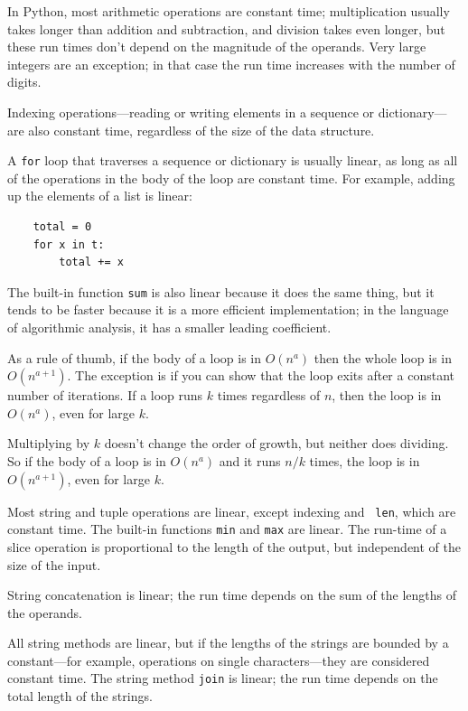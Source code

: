 \documentclass[10pt]{book}
\begin{document}
In Python, most arithmetic operations are constant time;
multiplication usually takes longer than addition and subtraction, and
division takes even longer, but these run times don't depend on the
magnitude of the operands.  Very large integers are an exception; in
that case the run time increases with the number of digits.

Indexing operations---reading or writing elements in a sequence
or dictionary---are also constant time, regardless of the size
of the data structure.

A {\tt for} loop that traverses a sequence or dictionary is
usually linear, as long as all of the operations in the body
of the loop are constant time.  For example, adding up the
elements of a list is linear:

\begin{verbatim}
    total = 0
    for x in t:
        total += x
\end{verbatim}

The built-in function {\tt sum} is also linear because it does
the same thing, but it tends to be faster because it is a more
efficient implementation; in the language of algorithmic analysis,
it has a smaller leading coefficient.

As a rule of thumb, if the body of a loop is in $O(n^a)$ then
the whole loop is in $O(n^{a+1})$.  The exception is if you can
show that the loop exits after a constant number of iterations.
If a loop runs $k$ times regardless of $n$, then
the loop is in $O(n^a)$, even for large $k$.

Multiplying by $k$ doesn't change the order of growth, but neither
does dividing.  So if the body of a loop is in $O(n^a)$ and it runs
$n/k$ times, the loop is in $O(n^{a+1})$, even for large $k$.

Most string and tuple operations are linear, except indexing and {\tt
  len}, which are constant time.  The built-in functions {\tt min} and
{\tt max} are linear.  The run-time of a slice operation is
proportional to the length of the output, but independent of the size
of the input.

String concatenation is linear; the run time depends on the sum
of the lengths of the operands.

All string methods are linear, but if the lengths of
the strings are bounded by a constant---for example, operations on single
characters---they are considered constant time.
The string method {\tt join} is linear; the run time depends on
the total length of the strings.
\end{document}
